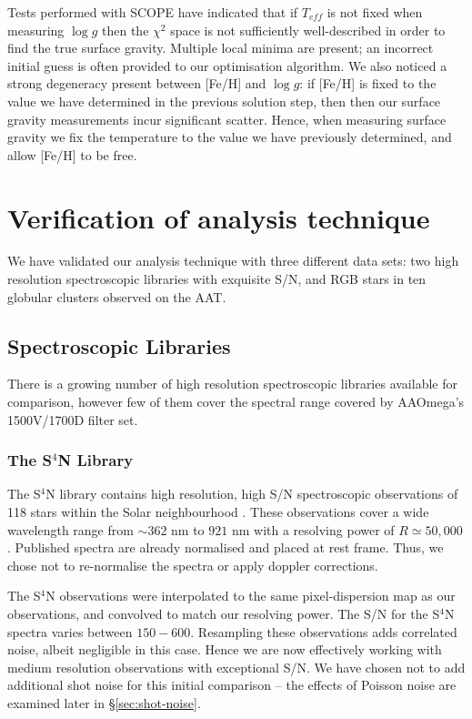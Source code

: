 \documentclass{emulateapj}
\begin{document}
Tests performed with SCOPE have indicated that if $T_{eff}$ is not fixed when measuring $\log{g}$ then the $\chi^2$ space is not sufficiently well-described in order to find the true surface gravity. Multiple local minima are present; an incorrect initial guess is often provided to our optimisation algorithm. We also noticed a strong degeneracy present between [Fe/H] and $\log{g}$: if [Fe/H] is fixed to the value we have determined in the previous solution step, then then our surface gravity measurements incur significant scatter. Hence, when measuring surface gravity we fix the temperature to the value we have previously determined, and allow [Fe/H] to be free.

\section{Verification of analysis technique}
\label{sec:calibration}

We have validated our analysis technique with three different data sets: two high resolution spectroscopic libraries with exquisite S/N, and RGB stars in ten globular clusters observed on the AAT.

\subsection{Spectroscopic Libraries}
There is a growing number of high resolution spectroscopic libraries available for comparison, however few of them cover the spectral range covered by AAOmega's 1500V/1700D filter set.

\label{sec:S4N}
\subsubsection{The S$^4$N Library}
The S${^4}$N library contains high resolution, high S/N spectroscopic observations of 118 stars within the Solar neighbourhood \citep{Allende-Prieto;et-al_2004}. These observations cover a wide wavelength range from $\sim362$ nm to $921$ nm with a resolving power of $R\simeq50,000$. Published spectra are already normalised and placed at rest frame. Thus, we chose not to re-normalise the spectra or apply doppler corrections.

The S$^4$N observations were interpolated to the same pixel-dispersion map as our observations, and convolved to match our resolving power. The S/N for the S$^4$N spectra varies between $150-600$. Resampling these observations adds correlated noise, albeit negligible in this case. Hence we are now effectively working with medium resolution observations with exceptional S/N. We have chosen not to add additional shot noise for this initial comparison \--- the effects of Poisson noise are examined later in \S\ref{sec:shot-noise}.
\end{document}

